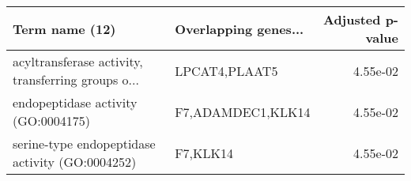 \begin{tabular}{llr}
\toprule
                                    Term name (12) & Overlapping genes... &  Adjusted p-value \\
\midrule
acyltransferase activity, transferring groups o... &        LPCAT4,PLAAT5 &          4.55e-02 \\
               endopeptidase activity (GO:0004175) &    F7,ADAMDEC1,KLK14 &          4.55e-02 \\
   serine-type endopeptidase activity (GO:0004252) &             F7,KLK14 &          4.55e-02 \\
\bottomrule
\end{tabular}
